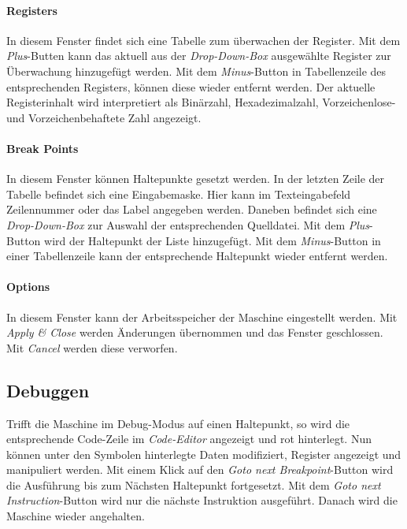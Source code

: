 \paragraph{Registers}
In diesem Fenster findet sich eine Tabelle zum überwachen der Register. Mit dem \emph{Plus}-Butten kann das aktuell aus der \emph{Drop-Down-Box} ausgewählte Register zur Überwachung hinzugefügt werden. Mit dem \emph{Minus}-Button in Tabellenzeile des entsprechenden Registers, können diese wieder entfernt werden. Der aktuelle Registerinhalt wird interpretiert als Binärzahl, Hexadezimalzahl, Vorzeichenlose- und  Vorzeichenbehaftete Zahl angezeigt. 

\paragraph{Break Points}
In diesem Fenster können Haltepunkte gesetzt werden. In der letzten Zeile der Tabelle befindet sich eine Eingabemaske. Hier kann im Texteingabefeld Zeilennummer oder das Label angegeben werden. Daneben befindet sich eine \emph{Drop-Down-Box} zur Auswahl der entsprechenden Quelldatei. Mit dem \emph{Plus}-Button wird der Haltepunkt der Liste hinzugefügt. Mit dem \emph{Minus}-Button in einer Tabellenzeile kann der entsprechende Haltepunkt wieder entfernt werden.

\paragraph{Options}
In diesem Fenster kann der Arbeitsspeicher der Maschine eingestellt werden. Mit \emph{Apply \& Close} werden Änderungen übernommen und das Fenster geschlossen. Mit \emph{Cancel} werden diese verworfen.

\subsection{Debuggen}
Trifft die Maschine im Debug-Modus auf einen Haltepunkt, so wird die entsprechende Code-Zeile im \emph{Code-Editor} angezeigt und rot hinterlegt. Nun können unter den Symbolen hinterlegte Daten modifiziert, Register angezeigt und manipuliert werden. Mit einem Klick auf den \emph{Goto next Breakpoint}-Button wird die Ausführung bis zum Nächsten Haltepunkt fortgesetzt. Mit dem \emph{Goto next Instruction}-Button wird nur die nächste Instruktion ausgeführt. Danach wird die Maschine wieder angehalten.  